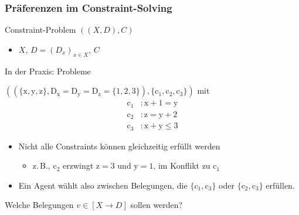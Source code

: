 \begin{frame}
\frametitle{Präferenzen im Constraint-Solving}

Constraint-Problem $((X, D), C)$
\begin{itemize}
  \item {} $X$,
 $D = (D_x)_{x \in X}$,
 $C$
\end{itemize}

\vspace*{1ex}

In der Praxis:  Probleme

\vspace*{2ex}

$((\{ \mathrm{x}, \mathrm{y}, \mathrm{z} \},
\mathrm{D}_{\mathrm{x}} = \mathrm{D}_{\mathrm{y}} =
\mathrm{D}_{\mathrm{z}} = \{ 1, 2, 3 \}), \{ \mathrm{c}_1,
\mathrm{c}_2, \mathrm{c}_3 \})$ mit
\bgroup{}
\begin{align*}
  \mathrm{c}_1 &: \mathrm{x} + 1 = \mathrm{y}
\\[-.4ex]
  \mathrm{c}_2 &: \mathrm{z} = \mathrm{y} + 2
\\[-.4ex]
  \mathrm{c}_3 &: \mathrm{x} + \mathrm{y} \leq 3
\end{align*}
\egroup

\begin{itemize}
  \item Nicht alle Constraints können gleichzeitig erfüllt werden
\begin{itemize}
  \item z.\,B., $\mathrm{c}_2$ erzwingt $\mathrm{z} = 3$ und $\mathrm{y} = 1$, im Konflikt zu $\mathrm{c}_1$
\end{itemize}

  \item Ein Agent wählt also zwischen Belegungen, die $\{ \mathrm{c}_1, \mathrm{c}_3 \}$ oder $\{ \mathrm{c}_2, \mathrm{c}_3 \}$ erfüllen.
\end{itemize}

\vspace*{2ex}

Welche Belegungen $v \in [X \to D]$ sollen  werden?

\end{frame}


